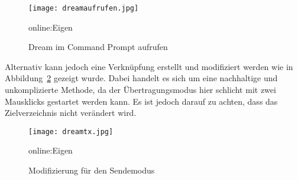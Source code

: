 \begin{figure}[H]
	\centering
	\texttt{[image: dreamaufrufen.jpg]}
	\caption[Dream im Command Prompt aufrufen]{Dream im Command Prompt aufrufen} \gls{online:Eigen}
	\label{fig:dreamaufrufen}
\end{figure}

Alternativ kann jedoch eine Verknüpfung erstellt und modifiziert werden wie in Abbildung~\ref{fig:dreamtx} gezeigt wurde. Dabei handelt es sich um eine nachhaltige und unkomplizierte Methode, da der Übertragungsmodus hier schlicht mit zwei Mausklicks gestartet werden kann. Es ist jedoch darauf zu achten, dass das Zielverzeichnis nicht verändert wird. 

\begin{figure}[H]
	\centering
	\texttt{[image: dreamtx.jpg]}
	\caption[Modifizierung für den Sendemodus]{Modifizierung für den Sendemodus} \gls{online:Eigen}
	\label{fig:dreamtx}
\end{figure}

